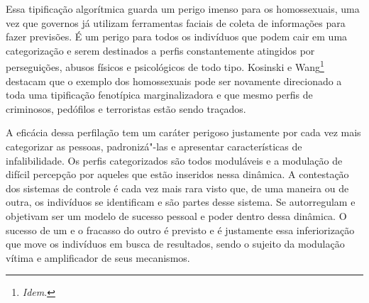 Essa tipificação algorítmica guarda um perigo imenso para os
homossexuais, uma vez que governos já utilizam ferramentas faciais de
coleta de informações para fazer previsões. É um perigo para todos os
indivíduos que podem cair em uma categorização e serem destinados a
perfis constantemente atingidos por perseguições, abusos físicos e
psicológicos de todo tipo. Kosinski e Wang\footnote{\textit{Idem}.} destacam que o exemplo
dos homossexuais pode ser novamente direcionado a toda uma tipificação
fenotípica marginalizadora e que mesmo perfis de criminosos, pedófilos e
terroristas estão sendo traçados.

A eficácia dessa perfilação tem um caráter perigoso justamente por cada
vez mais categorizar as pessoas, padronizá"-las e apresentar
características de infalibilidade. Os perfis categorizados são todos
moduláveis e a modulação de difícil percepção por aqueles que estão
inseridos nessa dinâmica. A contestação dos sistemas de controle é cada
vez mais rara visto que, de uma maneira ou de outra, os indivíduos se
identificam e são partes desse sistema. Se autorregulam e objetivam ser
um modelo de sucesso pessoal e poder dentro dessa dinâmica. O sucesso de
um e o fracasso do outro é previsto e é justamente essa inferiorização
que move os indivíduos em busca de resultados, sendo o sujeito da
modulação vítima e amplificador de seus mecanismos.


